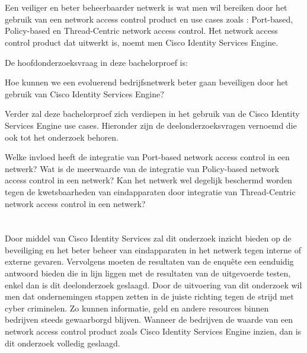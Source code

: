 \section{}
\label{sec:onderzoeksvraag}
Een veiliger en beter beheerbaarder netwerk is wat men wil bereiken door het gebruik van een network access control product en use cases zoals : Port-based, Policy-based en Thread-Centric network access control. Het network access control product dat uitwerkt is, noemt men Cisco Identity Services Engine.

De hoofdonderzoeksvraag in deze bachelorproef is: 
\begin{displayquote}
	Hoe kunnen we een evoluerend bedrijfsnetwerk beter gaan beveiligen door het gebruik van Cisco Identity Services Engine?
\newline
\newline
\end{displayquote}
Verder zal deze bachelorproef zich verdiepen in het gebruik van de Cisco Identity Services Engine use cases. Hieronder zijn de deelonderzoeksvragen vernoemd die ook tot het onderzoek behoren.
\begin{displayquote}
	Welke invloed heeft de integratie van Port-based network access control in een netwerk?  
\newline
\newline
	Wat is de meerwaarde van de integratie van Policy-based network access control in een netwerk?  
\newline
\newline
	Kan het netwerk wel degelijk beschermd worden tegen de 
	kwetsbaarheden van eindapparaten door integratie van Thread-Centric network access control in een netwerk?  
\end{displayquote}

\section{}
\label{sec:onderzoeksdoelstelling}

Door middel van Cisco Identity Services zal dit onderzoek inzicht bieden op de beveiliging en het beter beheer van eindapparaten in het netwerk tegen interne of externe gevaren. Vervolgens moeten de resultaten van de enquête een eenduidig antwoord bieden die in lijn liggen met de resultaten van de uitgevoerde testen, enkel dan is dit deelonderzoek geslaagd. Door de uitvoering van dit onderzoek wil men dat ondernemingen stappen zetten in de juiste richting tegen de strijd met cyber criminelen. Zo kunnen informatie, geld en andere resources binnen bedrijven steeds gewaarborgd blijven. Wanneer de bedrijven de waarde van een network access control product zoals Cisco Identity Services Engine inzien, dan is dit onderzoek volledig geslaagd.

